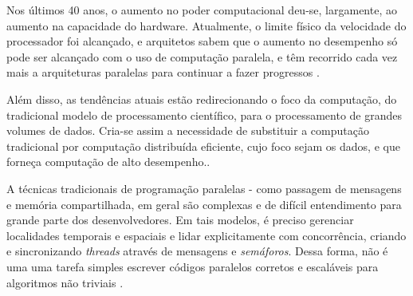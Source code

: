 Nos últimos 40 anos, o aumento no poder computacional deu-se, largamente, ao aumento na capacidade do hardware. Atualmente, o limite físico da velocidade do processador foi alcançado, e arquitetos sabem que o aumento no desempenho só pode ser alcançado com o uso de computação paralela, e têm recorrido cada vez mais a arquiteturas paralelas para continuar a fazer progressos \cite{Manferdelli:2008}. 

Além disso, as tendências atuais estão redirecionando o foco da computação, do tradicional modelo de processamento científico, para o processamento de grandes volumes de dados. Cria-se assim a necessidade de substituir a computação tradicional por computação distribuída eficiente, cujo foco sejam os dados, e que forneça computação de alto desempenho.\cite{Bryant:2011}. 

%
%  


A técnicas tradicionais de programação paralelas - como passagem de mensagens e memória compartilhada, em geral são complexas e de difícil entendimento para grande parte dos desenvolvedores. Em tais modelos, é preciso gerenciar localidades temporais e espaciais e lidar explicitamente com concorrência, criando e sincronizando \textit{threads} através de mensagens e \textit{semáforos}. Dessa forma, não é uma uma tarefa simples escrever códigos paralelos corretos e escaláveis para algoritmos não triviais \cite{Ranger:2007}.

